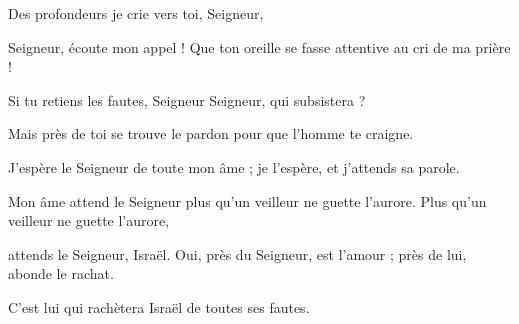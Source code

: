 \item Des profondeurs je crie vers toi, Seigneur,

\item Seigneur, écoute mon appel ! Que ton oreille se fasse attentive au cri de ma prière !

\item Si tu retiens les fautes, Seigneur Seigneur, qui subsistera ? 

\item Mais près de toi se trouve le pardon pour que l'homme te craigne.

\item J'espère le Seigneur de toute mon âme ; je l'espère, et j'attends sa parole.

\item Mon âme attend le Seigneur plus qu'un veilleur ne guette l'aurore. Plus qu'un veilleur ne guette l'aurore,

\item attends le Seigneur, Israël. Oui, près du Seigneur, est l'amour ; près de lui, abonde le rachat. 

\item C'est lui qui rachètera Israël de toutes ses fautes.